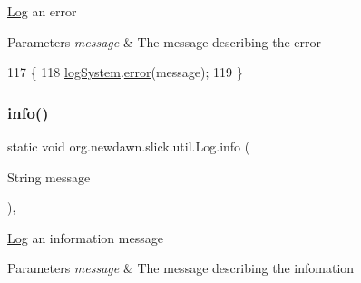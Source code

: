\mbox{\hyperlink{classorg_1_1newdawn_1_1slick_1_1util_1_1_log}{Log}} an error


\begin{DoxyParams}{Parameters}
{\em message} & The message describing the error \\
\hline
\end{DoxyParams}

\begin{DoxyCode}
117                                              \{
118         \mbox{\hyperlink{classorg_1_1newdawn_1_1slick_1_1util_1_1_log_acca32268a2a183e671051b4b9188cc72}{logSystem}}.\mbox{\hyperlink{interfaceorg_1_1newdawn_1_1slick_1_1util_1_1_log_system_a9ba18920fcc1e6b04324a1b9dfb40640}{error}}(message);
119     \}
\end{DoxyCode}
\mbox{\label{classorg_1_1newdawn_1_1slick_1_1util_1_1_log_aa324d3f6c44b2a66707b9d87edce37f8}} 
\subsubsection{\texorpdfstring{info()}{info()}}
{\footnotesize\ttfamily static void org.\+newdawn.\+slick.\+util.\+Log.\+info (\begin{DoxyParamCaption}\item[{String}]{message }\end{DoxyParamCaption})\hspace{0.3cm}{\ttfamily [inline]}, {\ttfamily [static]}}

\mbox{\hyperlink{classorg_1_1newdawn_1_1slick_1_1util_1_1_log}{Log}} an information message


\begin{DoxyParams}{Parameters}
{\em message} & The message describing the infomation \\
\hline
\end{DoxyParams}

